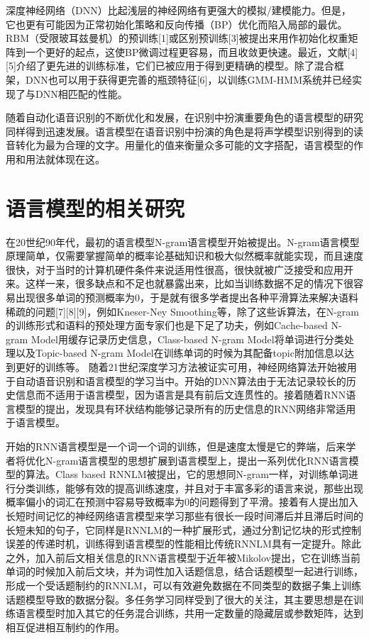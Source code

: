深度神经网络（DNN）比起浅层的神经网络有更强大的模拟/建模能力。但是， 它也更有可能因为正常初始化策略和反向传播（BP）优化而陷入局部的最优。RBM（受限玻耳兹曼机）的预训练[1]或区别预训练[3]被提出来用作初始化权重矩阵到一个更好的起点，这使BP微调过程更容易，而且收敛更快速。最近，文献[4][5]介绍了更先进的训练标准，它们已被应用于得到更精确的模型。除了混合框架，DNN也可以用于获得更完善的瓶颈特征[6]，以训练GMM-HMM系统并已经实现了与DNN相匹配的性能。

随着自动化语音识别的不断优化和发展，在识别中扮演重要角色的语言模型的研究同样得到迅速发展。语言模型在语音识别中扮演的角色是将声学模型识别得到的读音转化为最为合理的文字。用量化的值来衡量众多可能的文字搭配，语言模型的作用和用法就体现在这。


\section{语言模型的相关研究}
在20世纪90年代，最初的语言模型N-gram语言模型开始被提出。N-gram语言模型原理简单，仅需要掌握简单的概率论基础知识和极大似然概率就能实现，而且速度很快，对于当时的计算机硬件条件来说适用性很高，很快就被广泛接受和应用开来。这样一来，很多缺点和不足也就暴露出来，比如当训练数据不足的情况下很容易出现很多单词的预测概率为0，于是就有很多学者提出各种平滑算法来解决语料稀疏的问题[7][8][9]，例如Kneser-Ney Smoothing等，除了这些诉算法，在N-gram的训练形式和语料的预处理方面专家们也是下足了功夫，例如Cache-based N-gram Model用缓存记录历史信息，Class-based N-gram Model将单词进行分类处理以及Topic-based N-gram Model在训练单词的时候为其配备topic附加信息以达到更好的训练等。
随着21世纪深度学习方法被证实可用，神经网络算法开始被用于自动语音识别和语言模型的学习当中。开始的DNN算法由于无法记录较长的历史信息而不适用于语言模型，因为语言是具有前后文连贯性的。接着随着RNN语言模型的提出，发现具有环状结构能够记录所有的历史信息的RNN网络非常适用于语言模型。

开始的RNN语言模型是一个词一个词的训练，但是速度太慢是它的弊端，后来学者将优化N-gram语言模型的思想扩展到语言模型上，提出一系列优化RNN语言模型的算法。Class based RNNLM被提出，它的思想同N-gram一样，对训练单词进行分类训练，能够有效的提高训练速度，并且对于丰富多彩的语言来说，那些出现概率偏小的词汇在预测中容易导致概率为0的问题得到了平滑。接着有人提出加入长短时间记忆的神经网络语言模型来学习那些有很长一段时间滞后并且滞后时间的长短未知的句子，它同样是RNNLM的一种扩展形式，通过分割记忆块的形式控制误差的传递时机，训练得到语言模型的性能相比传统RNNLM具有一定提升。除此之外，加入前后文相关信息的RNN语言模型于近年被Mikolov提出，它在训练当前单词的时候加入前后文块，并为词性加入话题信息，结合话题模型一起进行训练，形成一个受话题制约的RNNLM，可以有效避免数据在不同类型的数据子集上训练话题模型导致的数据分裂。多任务学习同样受到了很大的关注，其主要思想是在训练语言模型时加入其它的任务混合训练，共用一定数量的隐藏层或参数矩阵，达到相互促进相互制约的作用。

